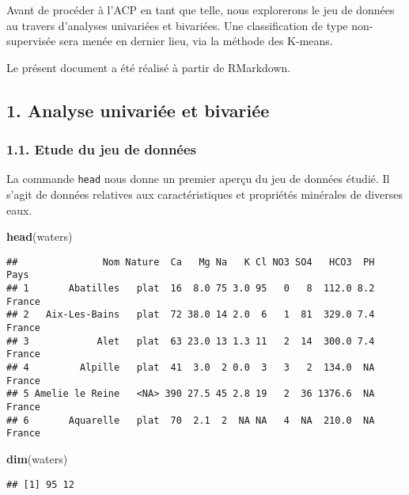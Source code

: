 \documentclass[]{article}
\newenvironment{Shaded}{\begin{snugshade}}{\end{snugshade}}
\newcommand{\KeywordTok}[1]{\textcolor[rgb]{0.13,0.29,0.53}{\textbf{#1}}}
\newcommand{\NormalTok}[1]{#1}
\begin{document}
Avant de procéder à l'ACP en tant que telle, nous explorerons le jeu de
données au travers d'analyses univariées et bivariées. Une
classification de type non-supervisée sera menée en dernier lieu, via la
méthode des K-means.

Le présent document a été réalisé à partir de RMarkdown.

\hypertarget{analyse-univariee-et-bivariee}{\subsection{1. Analyse
univariée et bivariée}\label{analyse-univariee-et-bivariee}}

\hypertarget{etude-du-jeu-de-donnees}{\subsubsection{1.1. Etude du jeu
de données}\label{etude-du-jeu-de-donnees}}

La commande \texttt{head} nous donne un premier aperçu du jeu de données
étudié. Il s'agit de données relatives aux caractéristiques et
propriétés minérales de diverses eaux.

\begin{Shaded}
\begin{Highlighting}[]
\KeywordTok{head}\NormalTok{(waters)}
\end{Highlighting}
\end{Shaded}

\begin{verbatim}
##               Nom Nature  Ca   Mg Na   K Cl NO3 SO4   HCO3  PH   Pays
## 1       Abatilles   plat  16  8.0 75 3.0 95   0   8  112.0 8.2 France
## 2   Aix-Les-Bains   plat  72 38.0 14 2.0  6   1  81  329.0 7.4 France
## 3            Alet   plat  63 23.0 13 1.3 11   2  14  300.0 7.4 France
## 4         Alpille   plat  41  3.0  2 0.0  3   3   2  134.0  NA France
## 5 Amelie le Reine   <NA> 390 27.5 45 2.8 19   2  36 1376.6  NA France
## 6       Aquarelle   plat  70  2.1  2  NA NA   4  NA  210.0  NA France
\end{verbatim}

\begin{Shaded}
\begin{Highlighting}[]
\KeywordTok{dim}\NormalTok{(waters)}
\end{Highlighting}
\end{Shaded}

\begin{verbatim}
## [1] 95 12
\end{verbatim}
\end{document}
